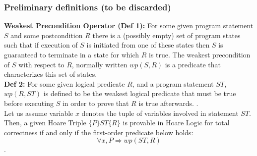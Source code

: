 \documentclass{article}
\begin{document}
\subsubsection{Preliminary definitions (to be discarded)}
\textbf{Weakest Precondition Operator (Def 1): }For some given program statement $S$ and some postcondition $R$ there is a (possibly empty) set of program states such that if execution of $S$ is initiated from one of these states then $S$ is guaranteed to terminate in a state for which $R$ is true. The weakest precondition of $S$ with respect to $R$, normally written $wp (S,R)$ is a predicate that characterizes this set of states.\\
\textbf{Def 2: }For some given logical predicate $R$, and a program statement $ST$, $wp(R,ST)$ is defined to be the weakest logical predicate that must be true before executing $S$ in order to prove that $R$ is true afterwards. \cite{wpdefinition}.\\
Let us assume variable $x$ denotes the tuple of variables involved in statement $ST$. Then, a given Hoare Triple $\{P\} ST \{R\}$ is provable in Hoare Logic for total correctness if and only if the first-order predicate below holds:
$$\forall x,P \Rightarrow wp(ST,R)$$.


\newpage
\end{document}
